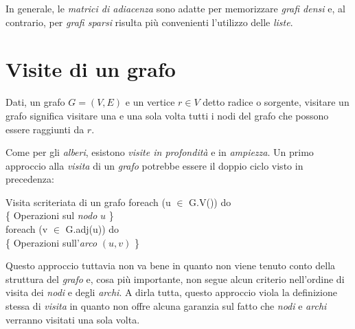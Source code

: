 \bigskip\noindent
In generale, le \emph{matrici di adiacenza} sono adatte per memorizzare
\emph{grafi densi} e, al contrario, per \emph{grafi sparsi} risulta più
convenienti l'utilizzo delle \emph{liste}.

\section{Visite di un grafo}
\begin{definition}
    Dati, un grafo $G=(V,E)$ e un vertice $r\in V$ detto radice o sorgente,
    visitare un grafo significa visitare una e una sola volta tutti i nodi del
    grafo che possono essere raggiunti da $r$.
\end{definition}\noindent
Come per gli \emph{alberi}, esistono \emph{visite in profondità} e in
\emph{ampiezza}. Un primo approccio alla \emph{visita} di un \emph{grafo}
potrebbe essere il doppio ciclo visto in precedenza:
\begin{minicode}{Visita scriteriata di un grafo}
\rmbreak\ind foreach (u $\in$ G.V()) do\\
    \{ Operazioni sul \emph{nodo} $u$ \}\\
    \indf foreach (v $\in$ G.adj(u)) do\\
        \{ Operazioni sull'\emph{arco} $(u,v)$ \}
\end{minicode}\noindent
Questo approccio tuttavia non va bene in quanto non viene tenuto conto della struttura
del \emph{grafo} e, cosa più importante, non segue alcun criterio nell'ordine
di visita dei \emph{nodi} e degli \emph{archi}. A dirla tutta, questo approccio
viola la definizione stessa di \emph{visita} in quanto non offre alcuna garanzia
sul fatto che \emph{nodi} e \emph{archi} verranno visitati una sola volta.


